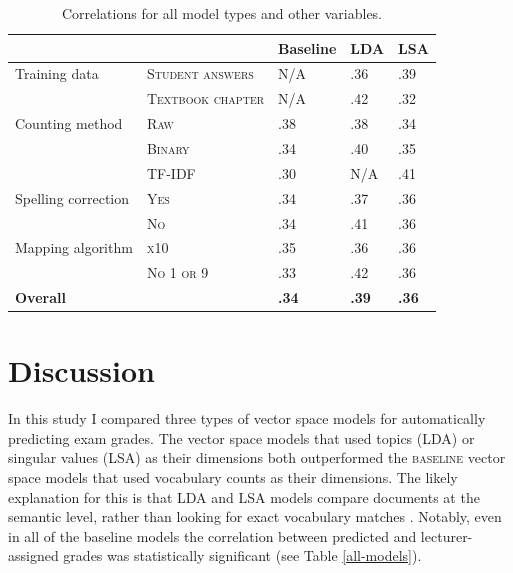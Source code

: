 \documentclass[a4paper,10pt,twoside]{article}
\begin{document}
\begin{table}[h]
	\caption{Correlations for all model types and other variables.}
	\label{table1}
	\centering
	\begin{tabular}{lllll}
		\hline  &  & \textbf{Baseline} & \textbf{LDA} & \textbf{LSA} \\ 
		\hline  Training data & \textsc{Student answers} & N/A & .36 & .39 \\ 
		& \textsc{Textbook chapter} & N/A & .42 & .32 \\ 
		\hline  Counting method & \textsc{Raw} & .38 & .38 & .34 \\ 
		& \textsc{Binary} & .34 & .40 & .35 \\ 
		& TF-IDF & .30 & N/A & .41 \\ 
		\hline  Spelling correction & \textsc{Yes} & .34 & .37 & .36 \\ 
		& \textsc{No} & .34 & .41 & .36 \\ 
		\hline  Mapping algorithm & \textsc{x10} & .35 & .36 & .36 \\ 
		& \textsc{No 1 or 9} & .33 & .42 & .36 \\ 
		\hline  \textbf{Overall} &  & \textbf{.34} & \textbf{.39} & \textbf{.36} \\ 
		\hline 
	\end{tabular} 
\end{table}

\section{Discussion}
In this study I compared three types of vector space models for automatically predicting exam grades. The vector space models that used topics (LDA) or singular values (LSA) as their dimensions both outperformed the \textsc{baseline} vector space models that used vocabulary counts as their dimensions. The likely explanation for this is that LDA and LSA models compare documents at the semantic level, rather than looking for exact vocabulary matches \cite{kakkonen2008}. Notably, even in all of the baseline models the correlation between predicted and lecturer-assigned grades was statistically significant (see Table \ref{all-models}).
\end{document}
